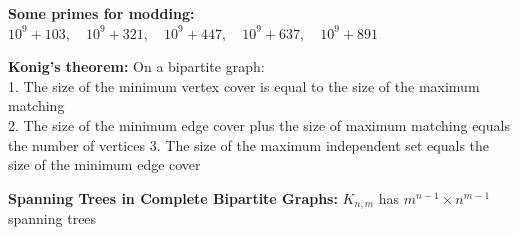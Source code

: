 \documentclass[a4paper,twocolumn]{article}
\newcommand\disappearingrule{%
	\par %
	\vskip5pt %
	\leaders\vrule width 0.4934\textwidth\vskip0.4pt %
	\nointerlineskip %
	\vskip2pt %
}
\begin{document}
{\textbf{Some primes for modding: } $10^9 + 103,\quad 10^9 + 321,\quad 10^9 + 447,\quad 10^9 + 637,\quad 10^9 + 891$

\disappearingrule

\textbf{Konig's theorem: } \textnormal{On a bipartite graph:}\\
\textnormal{1. The size of the minimum vertex cover is equal to the size of the maximum matching}\\
\textnormal{2. The size of the minimum edge cover plus the size of maximum matching equals the number of vertices}
\textnormal{3. The size of the maximum independent set equals the size of the minimum edge cover}

\textbf{Spanning Trees in Complete Bipartite Graphs: } \textnormal{$K_{n,m}$ has $m^{n-1} \times n^{m-1}$ spanning trees}

}
\end{document}
